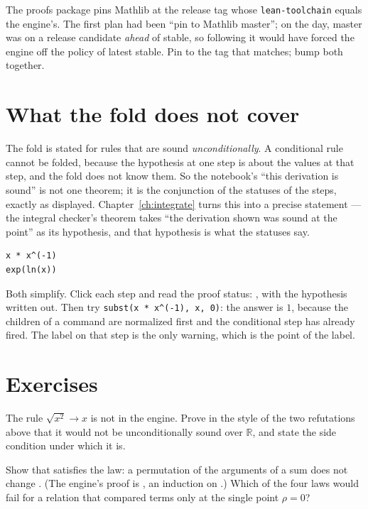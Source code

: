 \begin{logbox}
  The proofs package pins Mathlib at the release tag whose \texttt{lean-toolchain} equals the
  engine's. The first plan had been ``pin to Mathlib master''; on the day, master was on a
  release candidate \emph{ahead} of stable, so following it would have forced the engine off the
  policy of latest stable. Pin to the tag that matches; bump both together.
\end{logbox}

\section{What the fold does not cover}

The fold is stated for rules that are sound \emph{unconditionally}. A conditional rule cannot be
folded, because the hypothesis at one step is about the values at that step, and the fold does
not know them. So the notebook's ``this derivation is sound'' is not one theorem; it is the
conjunction of the statuses of the steps, exactly as displayed. Chapter~\ref{ch:integrate} turns
this into a precise statement --- the integral checker's theorem takes ``the derivation shown was
sound at the point'' as its hypothesis, and that hypothesis is what the statuses say.

\begin{trybox}
\begin{verbatim}
x * x^(-1)
exp(ln(x))
\end{verbatim}
  Both simplify. Click each step and read the proof status: , with the
  hypothesis written out. Then try \texttt{subst(x * x\^{}(-1), x, 0)}: the answer is $1$,
  because the children of a command are normalized first and the conditional step has already
  fired. The label on that step is the only warning, which is the point of the label.
\end{trybox}

\section{Exercises}

\begin{exercisebox}
  The rule $\sqrt{x^2} \to x$ is not in the engine. Prove in the style of the two refutations
  above that it would not be unconditionally sound over $\mathbb{R}$, and state the side
  condition under which it is.
\end{exercisebox}

\begin{exercisebox}
  Show that  satisfies the  law: a permutation of the arguments of a sum
  does not change . (The engine's proof is , an induction on
  .) Which of the four laws would fail for a relation that compared terms only at
  the single point $\rho = 0$?
\end{exercisebox}
